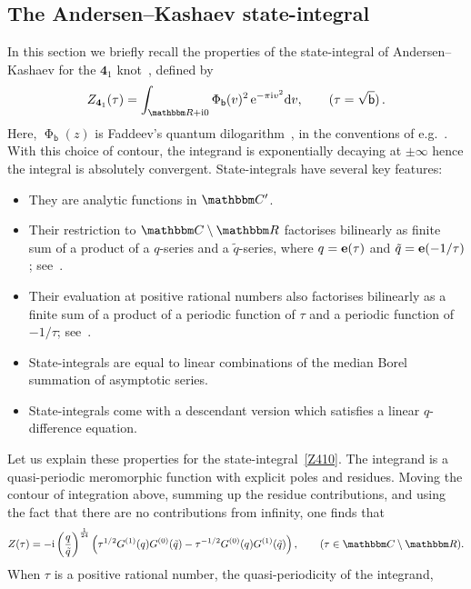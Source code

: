 \documentclass[12pt,reqno]{amsart}
\theoremstyle{definition}
\def\BR{\mathbbm R}
\def\BC{\mathbbm C}
\def\tq{\tilde{q}}
\def\be{\begin{equation}}
\def\ee{\end{equation}}
\def\e{\bold e}
\def\bb{\mathsf{b}}
\def\ri{\mathrm{i}}
\def\rd{\mathrm{d}}
\def\re{{\rm e}}
\def\ri{{\rm i}}
\def\rd{{\rm d}}
\def\e{\bold e}
\def\md{\mathbf}
\newcommand{\knot}[1]{\md{#1}}
\newcommand{\fad}{\operatorname{\Phi}_{\mathsf{b}}}
\begin{document}
\subsection{The Andersen--Kashaev state-integral}
\label{sub.AK41}

In this section we briefly recall the properties of the state-integral of
Andersen--Kashaev for the $\knot{4}_1$ knot~\cite[Sec.11.4]{AK}, defined by
\begin{equation}
  \label{Z410}
  Z_{\knot{4}_1}(\tau) = 
  \int_{\BR+\ri 0} \Phi_\bb(v)^2 \, \re^{-\pi \ri v^2} \rd v, \qquad (\tau=\sqrt{\bb}) \,.
\end{equation}
Here, $\fad (z)$ is Faddeev's quantum dilogarithm~\cite{Faddeev}, in the conventions of
e.g.~\cite[Appendix A]{AK}.
With this choice of contour, the integrand is exponentially decaying at $\pm \infty$
hence the integral is absolutely convergent. State-integrals have several key features:
\begin{itemize}
\item
  They are analytic functions in $\BC'$.
\item
  Their restriction to $\BC\setminus\BR$ factorises bilinearly as finite sum of a
  product of a $q$-series and a $\tilde q$-series, where $q=\e(\tau)$ and
  $\tilde q=\e(-1/\tau)$; see~\cite{Beem,GK:qseries}.
\item
  Their evaluation at positive rational numbers also factorises bilinearly as a finite
  sum of a product of a periodic function of $\tau$ and a periodic function of
  $-1/\tau$; see~\cite{GK:evaluation}.
\item
  State-integrals are equal to linear combinations of the median Borel summation
  of asymptotic series.
\item
  State-integrals come with a descendant version which satisfies a linear
  $q$-difference equation.
\end{itemize}
Let us explain these properties for the state-integral~\eqref{Z410}. The integrand
is a quasi-periodic meromorphic function with explicit poles and residues. Moving the
contour of integration above, summing up the residue contributions, and using the fact
that there are no contributions from infinity, one finds
that~\cite[Cor.1.7]{GK:qseries} 
\be
\label{zlmuv0}
 Z(\tau)    =
    -\ri 
    \left(\frac{q}{\tq}\right)^{\frac{1}{24}}
    \left(\tau^{1/2}G^{(1)}(q)G^{(0)}(\tq) -
     \tau^{-1/2} G^{(0)}(q)G^{(1)}(\tq)\right), \qquad (\tau \in \BC\setminus\BR). 
\ee
When $\tau$ is a positive rational number, the quasi-periodicity of the integrand,
\end{document}
